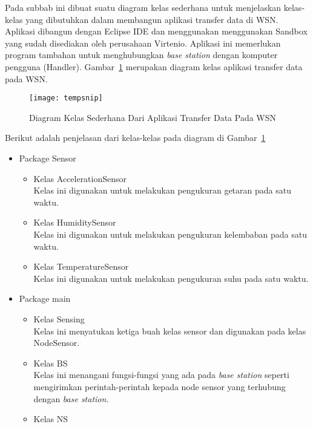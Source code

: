 Pada subbab ini dibuat suatu diagram kelas sederhana untuk menjelaskan kelas-kelas yang dibutuhkan dalam membangun aplikasi transfer data di WSN. Aplikasi dibangun dengan Eclipse IDE dan menggunakan menggunakan Sandbox yang sudah disediakan oleh perusahaan Virtenio. Aplikasi ini memerlukan program tambahan untuk menghubungkan \textit{base station} dengan komputer pengguna (Handler).  Gambar~\ref{fig:tempsnip} merupakan diagram kelas aplikasi transfer data pada WSN.

\begin{figure}[H]
	\centering
	\texttt{[image: tempsnip]}
	\caption{Diagram Kelas Sederhana Dari Aplikasi Transfer Data Pada WSN}
	\label{fig:tempsnip}
\end{figure}
Berikut adalah penjelasan dari kelas-kelas pada diagram di Gambar~\ref{fig:tempsnip}
\begin{itemize}
    \item Package Sensor
    \begin{itemize}
        \item Kelas AccelerationSensor\\
        Kelas ini digunakan untuk melakukan pengukuran getaran pada satu waktu.
        \item Kelas HumiditySensor\\
        Kelas ini digunakan untuk melakukan pengukuran kelembaban pada satu waktu.
        \item Kelas TemperatureSensor\\
        Kelas ini digunakan untuk melakukan pengukuran suhu pada satu waktu.
    \end{itemize}
    \item Package main
    \begin{itemize}
        \item Kelas Sensing\\
        Kelas ini menyatukan ketiga buah kelas sensor dan digunakan pada kelas NodeSensor.
        \item Kelas BS\\
        Kelas ini menangani fungsi-fungsi yang ada pada \textit{base station} seperti mengirimkan perintah-perintah kepada node sensor yang terhubung dengan \textit{base station}.
        \item Kelas NS\\

\end{itemize}
\end{itemize}
